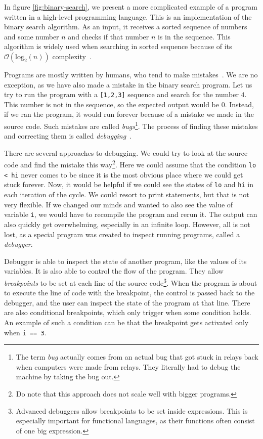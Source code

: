 In figure \ref{fig:binary-search}, we present a more complicated example of a
program written in a high-level programming language. This is an implementation
of the binary search algorithm. As an input, it receives a sorted sequence of
numbers and some number $n$ and checks if that number $n$ is in the sequence.
This algorithm is widely used when searching in sorted sequence because of its
$\mathcal{O}(\text{log}_2(n))$ complexity~\cite{pruvodce}.

Programs are mostly written by humans, who tend to make
mistakes~\cite{human-error}. We are no exception, as we have also made a
mistake in the binary search program. Let us try to run the program with a
\texttt{[1,2,3]} sequence and search for the number $4$. This number is not in
the sequence, so the expected output would be $0$. Instead, if we ran the
program, it would run forever because of a mistake we made in the source code.
Such mistakes are called \textit{bugs}\footnote{The term \textit{bug} actually
comes from an actual bug that got stuck in relays back when computers were made
from relays. They literally had to debug the machine by taking the bug out.}.
The process of finding these mistakes and correcting them is called
\textit{debugging}~\cite{art-of-testing}.

There are several approaches to debugging. We could try to look at the source
code and find the mistake this way\footnote{Do note that this approach does not
scale well with bigger programs.}. Here we could assume that the condition
\texttt{lo < hi} never comes to be since it is the most obvious place where we
could get stuck forever. Now, it would be helpful if we could see the states of
\texttt{lo} and \texttt{hi} in each iteration of the cycle. We could resort to
print statements, but that is not very flexible. If we changed our minds and
wanted to also see the value of variable \texttt{i}, we would have to recompile
the program and rerun it. The output can also quickly get overwhelming,
especially in an infinite loop. However, all is not lost, as a special program
was created to inspect running programs, called a \textit{debugger}.

Debugger is able to inspect the state of another program, like the values of
its variables. It is also able to control the flow of the program. They allow
\textit{breakpoints} to be set at each line of the source
code\footnote{Advanced debuggers allow breakpoints to be set inside
expressions. This is especially important for functional languages, as their
functions often consist of one big expression.}. When the program is about to
execute the line of code with the breakpoint, the control is passed back to the
debugger, and the user can inspect the state of the program at that line. There
are also conditional breakpoints, which only trigger when some condition holds.
An example of such a condition can be that the breakpoint gets activated only
when \texttt{i == 3}.

